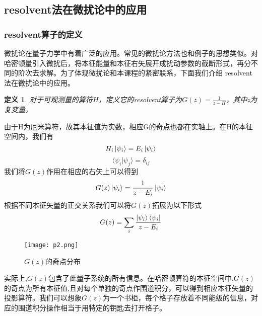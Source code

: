 \documentclass[12pt, a4paper, oneside]{ctexart}
\newtheorem{definition}[theorem]{定义}
\begin{document}
\subsection{resolvent法在微扰论中的应用}
\subsubsection{resolvent算子的定义}
微扰论在量子力学中有着广泛的应用。常见的微扰论方法也和例子的思想类似。对哈密顿量引入微扰后，将本征能量和本征右矢展开成扰动参数的截断形式，再分不同的阶次去求解。为了体现微扰论和本课程的紧密联系，下面我们介绍 resolvent法在微扰论中的应用。

\begin{definition}
    对于可观测量的算符$H$，定义它的resolvent算子为$G(z)=\frac{1}{z-H}$，其中z为复变量。
\end{definition}

由于H为厄米算符，故其本征值为实数，相应G的奇点也都在实轴上。在H的本征空间内，我们有
\begin{equation}
    H_i \ket{\psi_i}=E_i\ket{\psi_i}
\end{equation}
\begin{equation}
    \langle{\psi_i}|{\psi_j}\rangle=\delta_{ij}
\end{equation}
我们将$G(z)$作用在相应的右矢上可以得到
\begin{equation}
    G(z)\ket{\psi_i}=\frac{1}{z-E_i}\ket{\psi_i}
\end{equation}
根据不同本征矢量的正交关系我们可以将$G(z)$拓展为以下形式
\begin{equation}
    G(z)=\sum_i \frac{\ket{\psi_i}\bra{\psi_i}}{z-E_i}
\end{equation}

\begin{figure}[htbp]
    \centering
    \texttt{[image: p2.png]}
    \vspace{10pt} %
	\caption{$G(z)$的奇点分布}
\end{figure}

实际上,\(G(z)\)包含了此量子系统的所有信息。在哈密顿算符的本征空间中,\(G(z)\)的奇点为所有本征值,且对每个单独的奇点作围道积分，可以得到相应本征矢量的投影算符。我们可以想象\(G(z)\)为一个书柜，每个格子存放着不同能级的信息，对应的围道积分操作相当于用特定的钥匙去打开格子。
\end{document}
